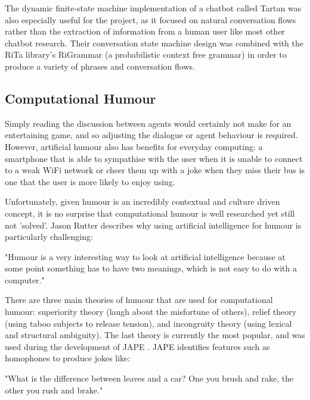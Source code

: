 \documentclass{article}
\begin{document}
The dynamic finite-state machine implementation of a chatbot called Tartan \cite{tartan} was also especially useful for the project, as it focused on natural conversation flows rather than the extraction of information from a human user like most other chatbot research. Their conversation state machine design was combined with the RiTa library's RiGrammar (a probabilistic context free grammar) in order to produce a variety of phrases and conversation flows. 

\subsection{Computational Humour}

Simply reading the discussion between agents would certainly not make for an entertaining game, and so adjusting the dialogue or agent behaviour is required. However, artificial humour also has benefits for everyday computing: a smartphone that is able to sympathise with the user when it is unable to connect to a weak WiFi network or cheer them up with a joke when they miss their bus is one that the user is more likely to enjoy using. 

Unfortunately, given humour is an incredibly contextual and culture driven concept, it is no surprise that computational humour is well researched yet still not 'solved'. Jason Rutter describes why using artificial intelligence for humour is particularly challenging:

\begin{displayquote}
"Humour is a very interesting way to look at artificial intelligence because at some point something has to have two meanings, which is not easy to do with a computer." \cite{jasonrutter}
\end{displayquote}

There are three main theories of humour that are used for computational humour: superiority theory (laugh about the misfortune of others), relief theory (using taboo subjects to release tension), and incongruity theory (using lexical and structural ambiguity). The last theory is currently the most popular, and was used during the development of JAPE \cite{jape}. JAPE identifies features such as homophones to produce jokes like:

\begin{displayquote}
	"What is the difference between leaves and a car? One you brush and rake, the other you rush and brake."
\end{displayquote}
\end{document}
